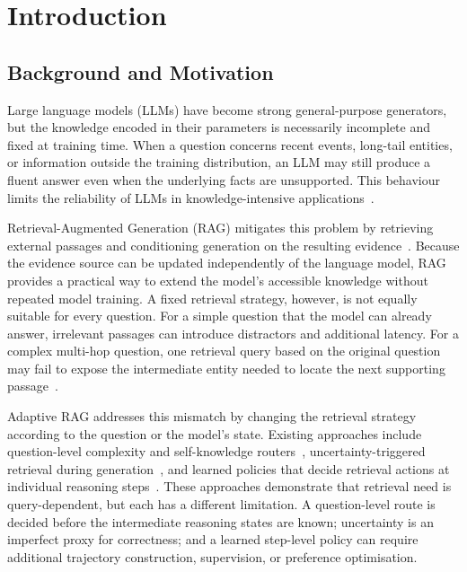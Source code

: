 \chapter{Introduction}
\label{ch:introduction}

\section{Background and Motivation}

Large language models (LLMs) have become strong general-purpose generators, but the knowledge encoded in their parameters is necessarily incomplete and fixed at training time. When a question concerns recent events, long-tail entities, or information outside the training distribution, an LLM may still produce a fluent answer even when the underlying facts are unsupported. This behaviour limits the reliability of LLMs in knowledge-intensive applications~\cite{hallucination_survey}.

Retrieval-Augmented Generation (RAG) mitigates this problem by retrieving external passages and conditioning generation on the resulting evidence~\cite{rag_survey}. Because the evidence source can be updated independently of the language model, RAG provides a practical way to extend the model's accessible knowledge without repeated model training. A fixed retrieval strategy, however, is not equally suitable for every question. For a simple question that the model can already answer, irrelevant passages can introduce distractors and additional latency. For a complex multi-hop question, one retrieval query based on the original question may fail to expose the intermediate entity needed to locate the next supporting passage~\cite{ren2023,ircot}.

Adaptive RAG addresses this mismatch by changing the retrieval strategy according to the question or the model's state. Existing approaches include question-level complexity and self-knowledge routers~\cite{adaptiverag,skr}, uncertainty-triggered retrieval during generation~\cite{flare,dragin}, and learned policies that decide retrieval actions at individual reasoning steps~\cite{selfrag,deeprag}. These approaches demonstrate that retrieval need is query-dependent, but each has a different limitation. A question-level route is decided before the intermediate reasoning states are known; uncertainty is an imperfect proxy for correctness; and a learned step-level policy can require additional trajectory construction, supervision, or preference optimisation.

